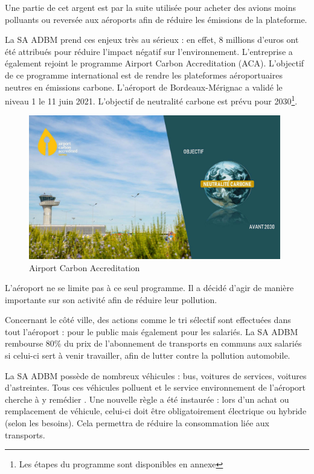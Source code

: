 Une partie de cet argent est par la suite utilisée pour acheter des avions moins polluants ou reversée aux aéroports afin de réduire les émissions de la plateforme.\newline

La SA ADBM prend ces enjeux très au sérieux : en effet, 8 millions d'euros ont été attribués pour réduire l'impact négatif sur l'environnement.
L'entreprise a également rejoint le programme Airport Carbon Accreditation (ACA). L'objectif de ce programme international est de rendre les plateformes aéroportuaires neutres en émissions carbone.
L'aéroport de Bordeaux-Mérignac a validé le niveau 1 le 11 juin 2021. L'objectif de neutralité carbone est prévu pour 2030\footnote{Les étapes du programme sont disponibles en annexe}.

\begin{figure}[hbt!]
  \centering
  \includegraphics[width=11cm]{Images/aca2030.jpg}
  \caption{Airport Carbon Accreditation}
  \label{fig:aca2030}
\end{figure}


L'aéroport ne se limite pas à ce seul programme. Il a décidé d'agir de manière importante sur son activité afin de réduire leur pollution.


Concernant le côté ville, des actions comme le tri sélectif sont effectuées dans tout l'aéroport : pour le public mais également pour les salariés. La SA ADBM rembourse 80\% du prix de l'abonnement de transports en communs aux salariés si celui-ci sert à venir travailler, afin de lutter contre la pollution automobile.


La SA ADBM possède de nombreux véhicules : bus, voitures de services, voitures d'astreintes. Tous ces véhicules polluent et le service environnement de l'aéroport cherche à y remédier . Une nouvelle règle a été instaurée : lors d'un achat ou remplacement de véhicule, celui-ci doit être obligatoirement électrique ou hybride (selon les besoins). Cela permettra de réduire la consommation liée aux transports.\newline



